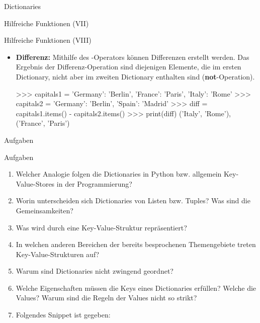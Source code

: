 \begin{subsection}{Dictionaries}
\begin{frame}[fragile]{Hilfreiche Funktionen (VII)}
\begin{itemize}
          \end{itemize}{}
                
        \end{frame}
        
                \begin{frame}[fragile]{Hilfreiche Funktionen (VIII)}
                
                \begin{itemize}
                    \item \textbf{Differenz:} Mithilfe des \code{-}-Operators können Differenzen erstellt werden. Das Ergebnis der Differenz-Operation sind diejenigen Elemente, die im ersten Dictionary, nicht aber im zweiten Dictionary enthalten sind (\textbf{not}-Operation).
      
  
\begin{pyconcode}
>>> capitals1 = {'Germany': 'Berlin', 'France': 'Paris', 'Italy': 'Rome'}
>>> capitals2 = {'Germany': 'Berlin', 'Spain': 'Madrid'}
>>> diff =  capitals1.items() - capitals2.items()
>>> print(diff)
{('Italy', 'Rome'), ('France', 'Paris')}
\end{pyconcode}                
                
          \end{itemize}
                
        \end{frame}
        
        \begin{subsubsection}{Aufgaben}
             \begin{frame}{Aufgaben}
                \begin{enumerate}
                    \item Welcher Analogie folgen die Dictionaries in Python bzw. allgemein Key-Value-Stores in der Programmierung?
                    \item Worin unterscheiden sich Dictionaries von Listen bzw. Tuples? Was sind die Gemeinsamkeiten?
                    \item Was wird durch eine Key-Value-Struktur repräsentiert?
                    \item In welchen anderen Bereichen der bereits besprochenen Themengebiete treten Key-Value-Strukturen auf?
                    \item Warum sind Dictionaries nicht zwingend geordnet?
                    \item Welche Eigenschaften müssen die Keys eines Dictionaries erfüllen? Welche die Values? Warum sind die Regeln der Values nicht so strikt?
                    \item Folgendes Snippet ist gegeben:


\end{enumerate}
\end{frame}
\end{subsubsection}
\end{subsection}
